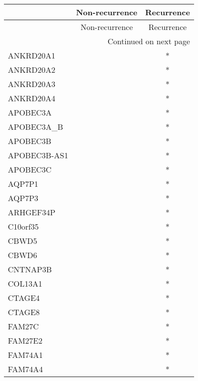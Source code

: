 \begin{longtable}{lcc}
\toprule
{} & Non-recurrence & Recurrence \\
\midrule
\endfirsthead

\toprule
{} & Non-recurrence & Recurrence \\
\midrule
\endhead
\midrule
\multicolumn{3}{r}{{Continued on next page}} \\
\midrule
\endfoot

\bottomrule
\endlastfoot
ANKRD20A1          &                &          * \\
ANKRD20A2          &                &          * \\
ANKRD20A3          &                &          * \\
ANKRD20A4          &                &          * \\
APOBEC3A           &                &          * \\
APOBEC3A\_B         &                &          * \\
APOBEC3B           &                &          * \\
APOBEC3B-AS1       &                &          * \\
APOBEC3C           &                &          * \\
AQP7P1             &                &          * \\
AQP7P3             &                &          * \\
ARHGEF34P          &                &          * \\
C10orf35           &                &          * \\
CBWD5              &                &          * \\
CBWD6              &                &          * \\
CNTNAP3B           &                &          * \\
COL13A1            &                &          * \\
CTAGE4             &                &          * \\
CTAGE8             &                &          * \\
FAM27C             &                &          * \\
FAM27E2            &                &          * \\
FAM74A1            &                &          * \\
FAM74A4            &                &          * \\

\end{longtable}
